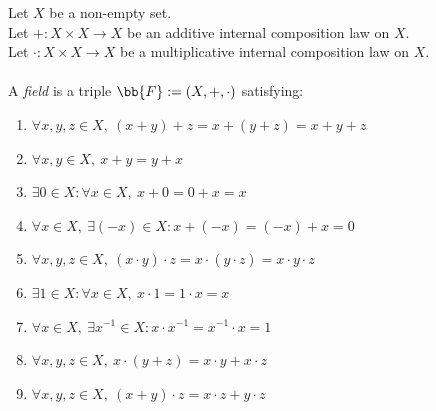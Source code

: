\begin{definition-pre}[Field]
    \label{def:field}
    Let $X$ be a non-empty set. \\
    Let $+: X\times X \to X$ be an additive internal composition law on $X$. \\
    Let $\cdot: X\times X \to X$ be a multiplicative internal composition law on $X$. \\\\
    A \textit{field} is a triple $\bb{F}:= (X, +, \cdot)$ satisfying:
    \begin{enumerate}
        \item [\textbf{(A1)}] $\forall x,y,z\in X,\ (x+y)+z= x+(y+z) = x+y+z$
        \item [\textbf{(C1)}] $\forall x,y\in X,\ x+y = y+x$
        \item [\textbf{(N1)}] $\exists 0 \in X : \forall x \in X,\ x+0 = 0+x = x$
        \item [\textbf{(I1)}] $\forall x \in X,\ \exists (-x)\in X: x+(-x) = (-x)+x = 0$
        \item [\textbf{(A2)}] $\forall x,y,z\in X,\ (x\cdot y)\cdot z= x\cdot(y\cdot z) = x\cdot y\cdot z$
        \item [\textbf{(N2)}] $\exists 1 \in X : \forall x \in X,\ x\cdot1 = 1\cdot x = x$
        \item [\textbf{(I2)}] $\forall x \in X,\ \exists x^{-1}\in X: x\cdot x^{-1} = x^{-1}\cdot x = 1$
        \item [\textbf{(D1)}] $\forall x,y,z \in X,\ x\cdot(y+z)=x\cdot y+x\cdot z$
        \item [\textbf{(D2)}] $\forall x,y,z \in X,\ (x+y)\cdot z=x\cdot z+y\cdot z$
    \end{enumerate}
\end{definition-pre}

